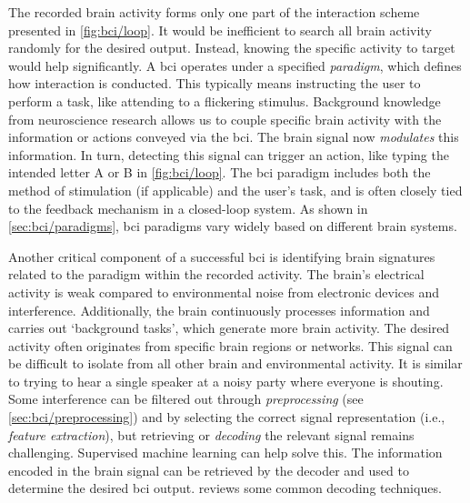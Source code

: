 The recorded brain activity forms only one part of the interaction scheme presented in
\cref{fig:bci/loop}.
It would be inefficient to search all brain activity randomly for the desired output.
Instead, knowing the specific activity to target would help significantly.
A \ac{bci} operates under a specified \emph{paradigm}, which defines how interaction
is conducted.
This typically means instructing the user to perform a task, like attending to a
flickering stimulus.
Background knowledge from neuroscience research allows us to couple specific brain
activity with the information or actions conveyed via the \ac{bci}.
The brain signal now \emph{modulates} this information.
In turn, detecting this signal can trigger an action, like typing the intended letter A
or B in \cref{fig:bci/loop}.
The \ac{bci} paradigm includes both the method of stimulation (if applicable) and the
user's task, and is often closely tied to the feedback mechanism in a closed-loop system.
As shown in \cref{sec:bci/paradigms}, \ac{bci} paradigms vary widely based on different
brain systems.

Another critical component of a successful \ac{bci} is identifying brain signatures
related to the paradigm within the recorded activity.
The brain's electrical activity is weak compared to environmental noise from electronic
devices and interference.
Additionally, the brain continuously processes information and carries out
`background tasks', which generate more brain activity.
The desired activity often originates from specific brain regions or networks.
This signal can be difficult to isolate from all other brain and environmental activity.
It is similar to trying to hear a single speaker at a noisy party where everyone is
shouting.
Some interference can be filtered out through \emph{preprocessing}
(see \cref{sec:bci/preprocessing}) and by selecting the correct signal representation
(i.e., \emph{feature extraction}), but retrieving or \emph{decoding} the relevant signal
remains challenging.
Supervised machine learning can help solve this.
The information encoded in the brain signal can be retrieved by the decoder and used
to determine the desired \ac{bci} output.
 reviews some common decoding techniques.

